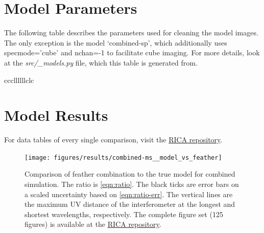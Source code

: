 \documentclass[preprint]{aastex63}
\begin{document}



\appendix
\section{Model Parameters}
\label{sec:models}

The following table describes the parameters used for cleaning the model images. The only exception is the model `combined-sp', which additionally uses specmode='cube' and nchan=-1 to facilitate cube imaging. For more details, look at the \textit{src/\_models.py} file, which this table is generated from.
\begin{longrotatetable}
   \movetabledown=1mm 
    \label{tab:model-params}
    \begin{deluxetable}{cccllllllclc}
        
        \startdata
        
        \enddata
        \end{deluxetable}
\end{longrotatetable}

\section{Model Results}
\label{sec:model-results}

For data tables of every single comparison, visit the \href{https://gitlab.com/mileslucas/rica/tree/master/docs/static/ratios}{RICA repository}.



\begin{figure}[h!]
	\texttt{[image: figures/results/combined-ms\_\_model\_vs\_feather]}
	\caption{Comparison of feather combination to the true model for combined simulation. The ratio is \autoref{eqn:ratio}. The black ticks are error bars on a scaled uncertainty based on \autoref{eqn:ratio-err}. The vertical lines are the maximum UV distance of the interferometer at the longest and shortest wavelengths, respectively. The complete figure set (125 figures) is available at the \href{https://gitlab.com/mileslucas/rica/tree/master/docs/static/images/results}{RICA repository}.}
\end{figure}
\end{document}
